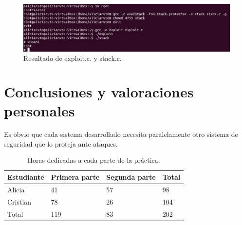 \documentclass[a4,12pt,onecolum]{article}
\begin{document}


\begin{figure}[htbp]
\centering
\includegraphics[width=1.0\textwidth]{./images/BOexploit.png}
\caption{Resultado de exploit.c. y stack.c.}
\label{fig:bo4}
\end{figure}

\clearpage
\section{Conclusiones y valoraciones personales}

Es obvio que cada sistema desarrollado necesita paralelamente otro sistema de seguridad que lo proteja ante ataques. \\

\begin{table}[htbp]
\begin{center}
\begin{tabular}{|p{3.0cm}||p{3.0cm}|p{3.0cm}||p{3.0cm}|}
\hline
Estudiante & Primera parte & Segunda parte & Total \\
\hline \hline
Alicia & 41 & 57 & 98 \\ \hline
Cristian & 78 & 26 & 104 \\ \hline
Total & 119 & 83 & 202 \\ \hline
\end{tabular}
\caption{Horas dedicadas a cada parte de la práctica.}
\label{tabla:sencilla}
\end{center}
\end{table}
\end{document}
